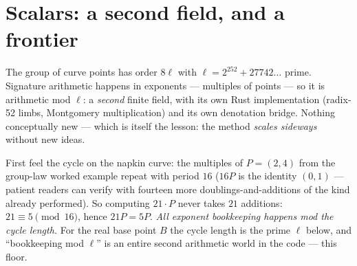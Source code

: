 \section{Scalars: a second field, and a frontier}

The group of curve points has order $8\ell$ with
$\ell = 2^{252} + 27742\ldots$ prime. Signature arithmetic happens in
exponents --- multiples of points --- so it is arithmetic mod $\ell$: a
\emph{second} finite field, with its own Rust implementation (radix-52
limbs, Montgomery multiplication) and its own denotation bridge. Nothing
conceptually new --- which is itself the lesson: the method \emph{scales
sideways} without new ideas.

First feel the cycle on the napkin curve: the multiples of $P = (2,4)$
from the group-law worked example repeat with period $16$ ($16P$ is the
identity $(0,1)$ --- patient readers can verify with fourteen more
doublings-and-additions of the kind already performed). So computing
$21 \cdot P$ never takes $21$ additions: $21 \equiv 5 \pmod{16}$, hence
$21P = 5P$. \emph{All exponent bookkeeping happens mod the cycle
length.} For the real base point $B$ the cycle length is the prime
$\ell$ below, and ``bookkeeping mod $\ell$'' is an entire second
arithmetic world in the code --- this floor.

